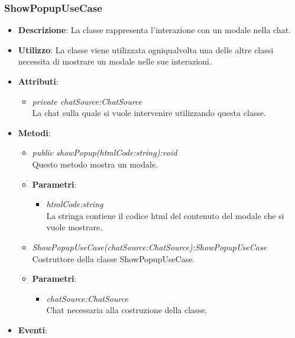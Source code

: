 \subsubsection{ShowPopupUseCase}
\begin{itemize}
\item \textbf{Descrizione}: La classe rappresenta l'interazione con un modale nella chat.
\item \textbf{Utilizzo}: La classe viene utilizzata ogniqualvolta una delle altre classi necessita di mostrare un modale nelle sue interazioni.
\item \textbf{Attributi}: 
	\begin{itemize}
	\item \textit{private chatSource:ChatSource}\\
	La chat sulla quale si vuole intervenire utilizzando questa classe.
	\end{itemize}
\item \textbf{Metodi}:
	\begin{itemize}
	\item \textit{public showPopup(htmlCode:string):void}\\
	Questo metodo mostra un modale.
			\item{\textbf{Parametri}: \begin{itemize}
			\item \textit{htmlCode:string}\\
			La stringa contiene il codice html del contenuto del modale che si vuole mostrare.
			\end{itemize}}
	\item \textit{ShowPopupUseCase(chatSource:ChatSource):ShowPopupUseCase}\\
	Costruttore della classe ShowPopupUseCase.
		\item{\textbf{Parametri}: \begin{itemize}
		\item \textit{chatSource:ChatSource}\\
		Chat necessaria alla costruzione della classe.
		\end{itemize}}
	\end{itemize}
\item \textbf{Eventi}:
\end{itemize}

